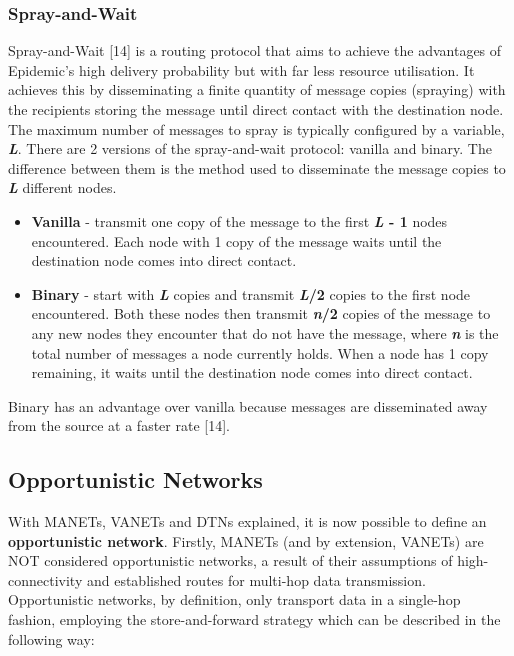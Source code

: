 \documentclass{article}
\begin{document}
\subsubsection{Spray-and-Wait}
Spray-and-Wait [14] is a routing protocol that aims to achieve the advantages of Epidemic's high delivery probability but with far less resource utilisation. It achieves this by disseminating a finite quantity of message copies (spraying) with the recipients storing the message until direct contact with the destination node. The maximum number of messages to spray is typically configured by a variable, \textbf{\textit{L}}. There are 2 versions of the spray-and-wait protocol: vanilla and binary. The difference between them is the method used to disseminate the message copies to \textbf{\textit{L}} different nodes.
\begin{itemize}
	\item \textbf{Vanilla} - transmit one copy of the message to the first \textbf{\textit{L} - 1} nodes encountered. Each node with 1 copy of the message waits until the destination node comes into direct contact.
	\item \textbf{Binary} - start with \textbf{\textit{L}} copies and transmit \textbf{\textit{L}/2} copies to the first node encountered. Both these nodes then transmit \textbf{\textit{n}/2} copies of the message to any new nodes they encounter that do not have the message, where \textbf{\textit{n}} is the total number of messages a node currently holds. When a node has 1 copy remaining, it waits until the destination node comes into direct contact.
\end{itemize}
Binary has an advantage over vanilla because messages are disseminated away from the source at a faster rate [14].

\subsection{Opportunistic Networks}
With MANETs, VANETs and DTNs explained, it is now possible to define an \textbf{opportunistic network}. Firstly, MANETs (and by extension, VANETs) are NOT considered opportunistic networks, a result of their assumptions of high-connectivity and established routes for multi-hop data transmission. Opportunistic networks, by definition, only transport data in a single-hop fashion, employing the store-and-forward strategy which can be described in the following way:
\end{document}
